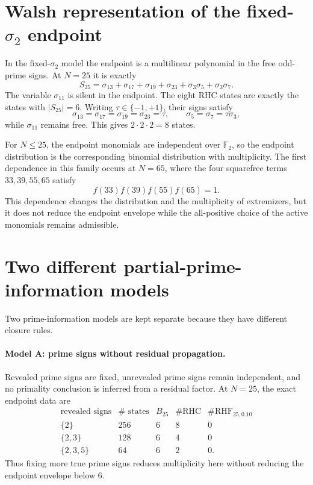 \documentclass[11pt]{article}
\newcommand{\RHC}{\mathrm{RHC}}
\newcommand{\RHF}{\mathrm{RHF}}
\begin{document}
\section{Walsh representation of the fixed-$\sigma_2$ endpoint}
In the fixed-$\sigma_2$ model the endpoint is a multilinear polynomial in the free odd-prime signs. At $N=25$ it is exactly
\[
 S_{25}
 =\sigma_{13}+\sigma_{17}+\sigma_{19}+\sigma_{23}
 +\sigma_3\sigma_5+\sigma_3\sigma_7.
\]
The variable $\sigma_{11}$ is silent in the endpoint. The eight RHC states are exactly the states with $|S_{25}|=6$. Writing $\tau\in\{-1,+1\}$, their signs satisfy
\[
 \sigma_{13}=\sigma_{17}=\sigma_{19}=\sigma_{23}=\tau,
 \qquad
 \sigma_5=\sigma_7=\tau\sigma_3,
\]
while $\sigma_{11}$ remains free. This gives $2\cdot2\cdot2=8$ states.

For $N\le25$, the endpoint monomials are independent over $\mathbb F_2$, so the endpoint distribution is the corresponding binomial distribution with multiplicity. The first dependence in this family occurs at $N=65$, where the four squarefree terms $33,39,55,65$ satisfy
\[
 f(33)f(39)f(55)f(65)=1.
\]
This dependence changes the distribution and the multiplicity of extremizers, but it does not reduce the endpoint envelope while the all-positive choice of the active monomials remains admissible.

\section{Two different partial-prime-information models}
Two prime-information models are kept separate because they have different closure rules.

\paragraph{Model A: prime signs without residual propagation.}
Revealed prime signs are fixed, unrevealed prime signs remain independent, and no primality conclusion is inferred from a residual factor. At $N=25$, the exact endpoint data are
\[
\begin{array}{c|r|r|r|r}
\text{revealed signs}&\#\text{ states}&B_{25}&\#\RHC&\#\RHF_{25,0.10}\\ \hline
\{2\}&256&6&8&0\\
\{2,3\}&128&6&4&0\\
\{2,3,5\}&64&6&2&0.
\end{array}
\]
Thus fixing more true prime signs reduces multiplicity here without reducing the endpoint envelope below $6$.
\end{document}
